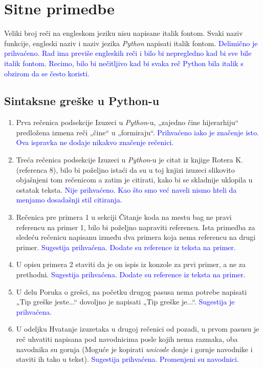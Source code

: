 \documentclass[a4paper]{report}
\newcommand{\odgovor}[1]{\textcolor{blue}{#1}}
\begin{document}
\section{Sitne primedbe}
Veliki broj reči na engleskom jeziku nisu napisane italik fontom. Svaki naziv funkcije, engleski naziv i naziv jezika \emph{Python} napisati italik fontom.
\odgovor{Delimično je prihvaćeno. Rad ima previše engleskih reči i bilo bi nepregledno kad bi sve bile italik fontom. Recimo, bilo bi nečitljivo kad bi svaka reč Python bila italik s obzirom da se često koristi.}
\subsection{Sintaksne greške u Python-u}
\begin{enumerate}
    \item Prva rečenica podsekcije Izuzeci u \emph{Python}-u, „zajedno čine hijerarhiju“ predložena izmena reči „čine“ u „formiraju“.
    \odgovor{Prihvaćeno iako je značenje isto. Ova ispravka ne dodaje nikakvo značenje rečenici.}
    \item Treća rečenica podsekcije Izuzeci u \emph{Python}-u je citat iz knjige Rotera K. (referenca 8), bilo bi poželjno istaći da su u toj knjizi izuzeci slikovito objašnjeni tom rečenicom a zatim je citirati, kako bi se skladnije uklopila u ostatak teksta.
    \odgovor{Nije prihvaćeno. Kao što smo već naveli nismo hteli da menjamo dosadašnji stil citiranja.}
    \item Rečenica pre primera 1 u sekciji Čitanje koda na mestu bag ne pravi referencu na primer 1, bilo bi poželjno napraviti referencu. Ista primedba za sledeću rečenicu napisanu između dva primera koja nema referencu na drugi primer.
    \odgovor{Sugestija prihvaćena. Dodate su reference iz teksta na primer.}
    \item U opisu primera 2 staviti da je on ispis iz konzole za prvi primer, a ne za prethodni.
    \odgovor{Sugestija prihvaćena. Dodate su reference iz teksta na primer.}
    \item U delu Poruka o grešci, na početku drugog pasusa nema potrebe napisati „Tip greške jeste...“ dovoljno je napisati „Tip greške je...“.
    \odgovor{Sugestija je prihvaćena.}
    \item U odeljku Hvatanje izuzetaka u drugoj rečenici od pozadi, u prvom pasusu je reč uhvatiti napisana pod navodnicima posle kojih nema razmaka, oba navodnika su gornja (Moguće je kopirati \emph{unicode} donje i gornje navodnike i staviti ih tako u tekst).
    \odgovor{Sugestija prihvaćena. Promenjeni su navodnici.}
\end{enumerate}
\end{document}
